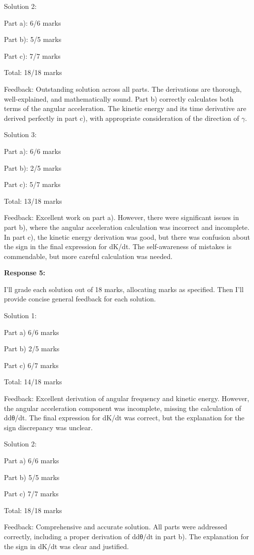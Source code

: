 \documentclass[a4paper,11pt]{article}
\begin{document}
Solution 2:

Part a): 6/6 marks

Part b): 5/5 marks

Part c): 7/7 marks

Total: 18/18 marks

Feedback: Outstanding solution across all parts. The derivations are thorough, well-explained, and mathematically sound. Part b) correctly calculates both terms of the angular acceleration. The kinetic energy and its time derivative are derived perfectly in part c), with appropriate consideration of the direction of \( \gamma \).

Solution 3:

Part a): 6/6 marks

Part b): 2/5 marks

Part c): 5/7 marks

Total: 13/18 marks

Feedback: Excellent work on part a). However, there were significant issues in part b), where the angular acceleration calculation was incorrect and incomplete. In part c), the kinetic energy derivation was good, but there was confusion about the sign in the final expression for dK/dt. The self-awareness of mistakes is commendable, but more careful calculation was needed.

\bigskip
\textbf{Response 5:}

I'll grade each solution out of 18 marks, allocating marks as specified. Then I'll provide concise general feedback for each solution.

Solution 1:

Part a) 6/6 marks

Part b) 2/5 marks

Part c) 6/7 marks

Total: 14/18 marks

Feedback: Excellent derivation of angular frequency and kinetic energy. However, the angular acceleration component was incomplete, missing the calculation of ddθ/dt. The final expression for dK/dt was correct, but the explanation for the sign discrepancy was unclear.

Solution 2:

Part a) 6/6 marks

Part b) 5/5 marks

Part c) 7/7 marks

Total: 18/18 marks

Feedback: Comprehensive and accurate solution. All parts were addressed correctly, including a proper derivation of ddθ/dt in part b). The explanation for the sign in dK/dt was clear and justified.
\end{document}
